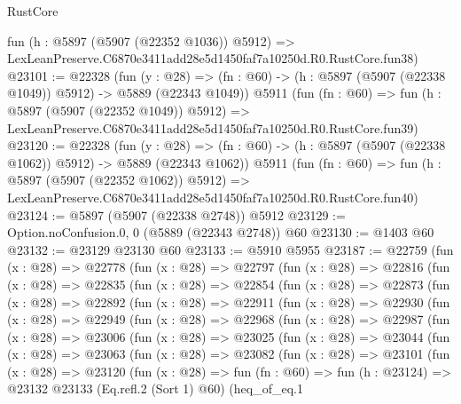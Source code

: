 \begin{lexlean}{RustCore}
\begin{coremodule}
    fun (h : @5897 (@5907 (@22352 @1036)) @5912) =>
    LexLeanPreserve.C6870e3411add28e5d1450faf7a10250d.R0.RustCore.fun38)
@23101 := @22328
    (fun (y : @28) =>
    (fn : @60) -> (h : @5897 (@5907 (@22338 @1049)) @5912) -> @5889 (@22343 @1049))
    @5911
    (fun (fn : @60) =>
    fun (h : @5897 (@5907 (@22352 @1049)) @5912) =>
    LexLeanPreserve.C6870e3411add28e5d1450faf7a10250d.R0.RustCore.fun39)
@23120 := @22328
    (fun (y : @28) =>
    (fn : @60) -> (h : @5897 (@5907 (@22338 @1062)) @5912) -> @5889 (@22343 @1062))
    @5911
    (fun (fn : @60) =>
    fun (h : @5897 (@5907 (@22352 @1062)) @5912) =>
    LexLeanPreserve.C6870e3411add28e5d1450faf7a10250d.R0.RustCore.fun40)
@23124 := @5897 (@5907 (@22338 @2748)) @5912
@23129 := Option.noConfusion.{0, 0} (@5889 (@22343 @2748)) @60
@23130 := @1403 @60
@23132 := @23129 @23130 @60
@23133 := @5910 @5955
@23187 := @22759
    (fun (x : @28) =>
    @22778
      (fun (x : @28) =>
      @22797
        (fun (x : @28) =>
        @22816
          (fun (x : @28) =>
          @22835
            (fun (x : @28) =>
            @22854
              (fun (x : @28) =>
              @22873
                (fun (x : @28) =>
                @22892
                  (fun (x : @28) =>
                  @22911
                    (fun (x : @28) =>
                    @22930
                      (fun (x : @28) =>
                      @22949
                        (fun (x : @28) =>
                        @22968
                          (fun (x : @28) =>
                          @22987
                            (fun (x : @28) =>
                            @23006
                              (fun (x : @28) =>
                              @23025
                                (fun (x : @28) =>
                                @23044
                                  (fun (x : @28) =>
                                  @23063
                                    (fun (x : @28) =>
                                    @23082
                                      (fun (x : @28) =>
                                      @23101
                                        (fun (x : @28) =>
                                        @23120
                                          (fun (x : @28) =>
                                          fun (fn : @60) =>
                                          fun (h : @23124) =>
                                          @23132
                                            @23133
                                            (Eq.refl.{2} (Sort 1) @60)
                                            (heq_of_eq.{1}

\end{coremodule}
\end{lexlean}
